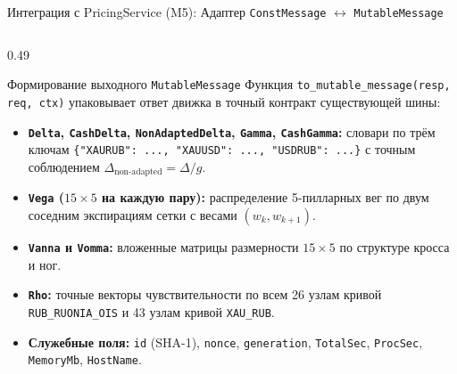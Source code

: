 \documentclass[aspectratio=169, 9pt]{beamer}
\begin{document}
\begin{frame}{Интеграция с PricingService (M5): Адаптер \texttt{ConstMessage} $\leftrightarrow$ \texttt{MutableMessage}}
\begin{columns}[T]
    \begin{column}{0.49\textwidth}
      \begin{exampleblock}{Формирование выходного \texttt{MutableMessage}}
        Функция \texttt{to\_mutable\_message(resp, req, ctx)} упаковывает ответ движка в точный контракт существующей шины:
        \begin{itemize}
          \item \textbf{\texttt{Delta}, \texttt{CashDelta}, \texttt{NonAdaptedDelta}, \texttt{Gamma}, \texttt{CashGamma}:} словари по трём ключам \texttt{\{"XAURUB": ..., "XAUUSD": ..., "USDRUB": ...\}} с точным соблюдением $\Delta_{\text{non-adapted}} = \Delta / g$.
          \item \textbf{\texttt{Vega} ($15 \times 5$ на каждую пару):} распределение 5-пилларных вег по двум соседним экспирациям сетки с весами $(w_k, w_{k+1})$.
          \item \textbf{\texttt{Vanna} и \texttt{Vomma}:} вложенные матрицы размерности $15 \times 5$ по структуре кросса и ног.
          \item \textbf{\texttt{Rho}:} точные векторы чувствительности по всем 26 узлам кривой \texttt{RUB\_RUONIA\_OIS} и 43 узлам кривой \texttt{XAU\_RUB}.
          \item \textbf{Служебные поля:} \texttt{id} (SHA-1), \texttt{nonce}, \texttt{generation}, \texttt{TotalSec}, \texttt{ProcSec}, \texttt{MemoryMb}, \texttt{HostName}.
        \end{itemize}
      \end{exampleblock}
    \end{column}
  \end{columns}
\end{frame}
\end{document}
